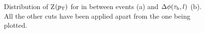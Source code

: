 \begin{figure}[H]
	\centering
	\hfill
	\hfill
	\caption{Distribution of Z$(p_\text{T})$ for in between events (a) and $\Delta\phi(\tau_\text{h},l)$ (b). All the other cuts have been applied apart from the one being plotted.}
	\label{Fig22}
\end{figure}